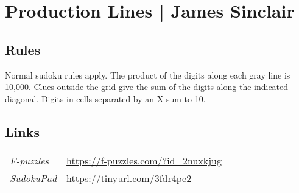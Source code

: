 \section[Production Lines | James Sinclair {[\emph{Sudoku}]}]{Production Lines | {\normalfont James Sinclair}}
\label{sec:25-production-lines-james-sinclair}

\subsection*{Rules}
\begin{markdown}
Normal sudoku rules apply. The product of the digits along each gray line is 10,000. Clues outside the grid give the sum of the digits along the indicated diagonal. Digits in cells separated by an X sum to 10.
\end{markdown}
\subsection*{Links}
\begin{tabularx}{\textwidth}{l X}
\emph{F-puzzles} & \url{https://f-puzzles.com/?id=2nuxkjug} \\
\emph{SudokuPad} & \url{https://tinyurl.com/3fdr4pe2} \\
\end{tabularx}
\pagebreak
